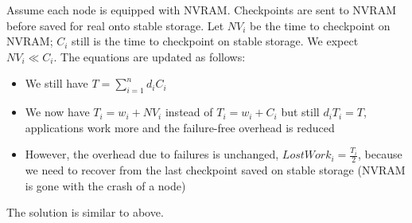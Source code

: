 \documentclass{article}
\begin{document}
Assume each node is equipped with NVRAM. Checkpoints are sent to NVRAM before
saved for real onto stable storage. Let $NV_{i}$ be the time to checkpoint on NVRAM; $C_{i}$
still is the time to checkpoint on stable storage. We expect $NV_{i} \ll C_{i}$.
The equations are updated as follows:
\begin{itemize}
\item We still have $T  = \sum_{i=1}^{n} d_{i} C_{i}$
\item  We now have $T_{i}= w_{i}+NV_{i}$ instead of $T_{i}= w_{i}+C_{i}$
but still $d_{i} T_{i}=T$, applications work more and the failure-free overhead is reduced
\item However, the overhead due to failures is unchanged, 
$LostWork_{i} = \frac{T_{i}}{2}$, 
because we need to recover from the last checkpoint saved on stable storage (NVRAM is gone with the crash of a node)
\end{itemize}
The solution is similar to above.
\end{document}
